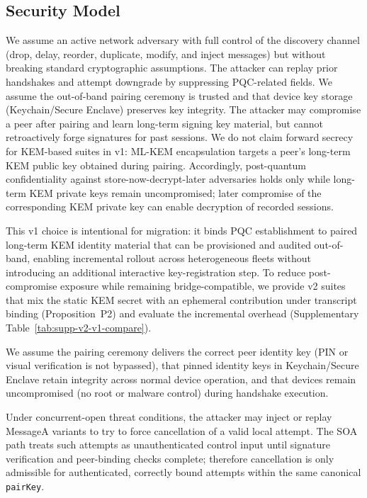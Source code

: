 \documentclass[10pt,journal,compsoc]{IEEEtran}
\begin{document}
\subsection{Security Model}\label{a.-security-model}

We assume an active network adversary with full control of the discovery
channel (drop, delay, reorder, duplicate, modify, and inject messages)
but without breaking standard cryptographic assumptions. The attacker
can replay prior handshakes and attempt downgrade by suppressing
PQC-related fields. We assume the out-of-band pairing ceremony is
trusted and that device key storage (Keychain/Secure Enclave) preserves
key integrity. The attacker may compromise a peer after pairing and
learn long-term signing key material, but cannot retroactively forge
signatures for past sessions. We do not claim forward secrecy for
KEM-based suites in v1: ML-KEM encapsulation targets a peer's long-term
KEM public key obtained during pairing. Accordingly, post-quantum
confidentiality against store-now-decrypt-later adversaries holds only
while long-term KEM private keys remain uncompromised; later compromise
of the corresponding KEM private key can enable decryption of recorded
sessions.

This v1 choice is intentional for migration: it binds PQC establishment
to paired long-term KEM identity material that can be provisioned and
audited out-of-band, enabling incremental rollout across heterogeneous
fleets without introducing an additional interactive key-registration
step. To reduce post-compromise exposure while remaining
bridge-compatible, we provide v2 suites that mix the static KEM secret
with an ephemeral contribution under transcript binding
(Proposition~P2) and evaluate the incremental overhead (Supplementary
Table~\ref{tab:supp-v2-v1-compare}).

We assume the pairing ceremony delivers the correct peer identity key
(PIN or visual verification is not bypassed), that pinned identity keys
in Keychain/Secure Enclave retain integrity across normal device
operation, and that devices remain uncompromised (no root or malware
control) during handshake execution.

Under concurrent-open threat conditions, the attacker may inject or
replay MessageA variants to try to force cancellation of a valid local
attempt. The SOA path treats such attempts as unauthenticated control
input until signature verification and peer-binding checks complete;
therefore cancellation is only admissible for authenticated, correctly
bound attempts within the same canonical \texttt{pairKey}.
\end{document}
